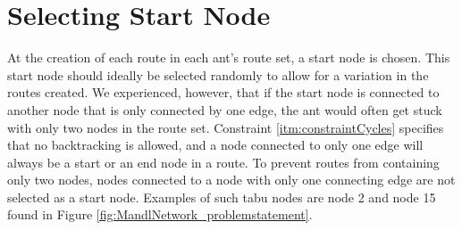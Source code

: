 \section{Selecting Start Node}

At the creation of each route in each ant's route set, a start node is chosen. This start node should ideally be selected randomly to allow for a variation in the routes created. We experienced, however, that if the start node is connected to another node that is only connected by one edge, the ant would often get stuck with only two nodes in the route set. Constraint \vref{itm:constraintCycles} specifies that no backtracking is allowed, and a node connected to only one edge will always be a start or an end node in a route. To prevent routes from containing only two nodes, nodes connected to a node with only one connecting edge are not selected as a start node. Examples of such tabu nodes are node 2 and node 15 found in Figure \vref{fig:MandlNetwork_problemstatement}. 